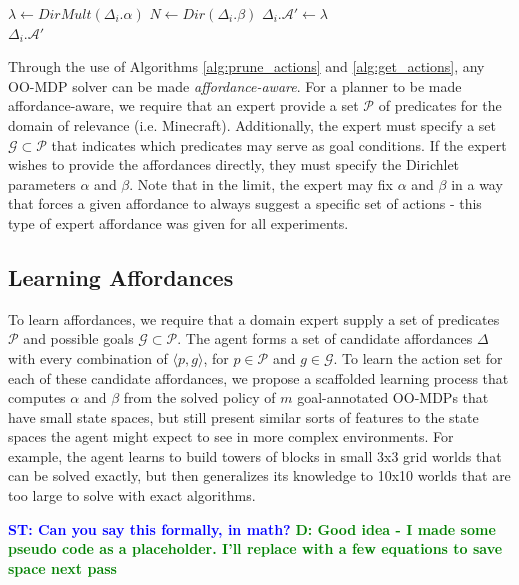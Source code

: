 \documentclass[conference]{IEEEtran}
\newcommand{\stnote}[1]{\textcolor{Blue}{\textbf{ST: #1}}}
\newcommand{\dnote}[1]{\textcolor{Green}{\textbf{D: #1}}}
\begin{document}
\begin{algorithm}
  \caption{$\Delta_i.getActions(s)$}
  \begin{algorithmic}[1]
    \State $\lambda \leftarrow DirMult(\Delta_i.\alpha)$
    \State $N \leftarrow Dir(\Delta_i.\beta)$
    \State $\Delta_i.\mathcal{A}' \leftarrow \lambda$
    \EndFor \\
    \Return $\Delta_i.\mathcal{A}'$
  \end{algorithmic}
  \label{alg:get_actions}
\end{algorithm}

Through the use of Algorithms \ref{alg:prune_actions} and \ref{alg:get_actions}, any OO-MDP solver can be made
{\it affordance-aware}. For a planner to be made affordance-aware, we require that an expert provide a set $\mathcal{P}$ of predicates
for the domain of relevance (i.e. Minecraft). Additionally, the expert must specify a set
$\mathcal{G} \subset \mathcal{P}$ that indicates which predicates may serve as goal conditions. If the expert wishes
to provide the affordances directly, they must specify the Dirichlet parameters $\alpha$ and $\beta$. Note that
in the limit, the expert may fix $\alpha$ and $\beta$ in a way that forces a given
affordance to always suggest a specific set of actions - this type of expert affordance was given for all
experiments.

\subsection{Learning Affordances}

To learn affordances, we require that a domain expert supply a set of predicates
$\mathcal{P}$ and possible goals $\mathcal{G} \subset \mathcal{P}$.
The agent forms a set of candidate affordances $\Delta$ with every
combination of $\langle p, g \rangle$, for $p \in \mathcal{P}$ and $g
\in \mathcal{G}$.  To learn the action set for each of these candidate
affordances, we propose a scaffolded learning process that computes
$\alpha$ and $\beta$ from the solved policy of $m$ goal-annotated
OO-MDPs that have small state spaces, but still present similar sorts
of features to the state spaces the agent might expect to see in more
complex environments.  For example, the agent learns to build towers
of blocks in small 3x3 grid worlds that can be solved exactly, but
then generalizes its knowledge to 10x10 worlds that are too large to
solve with exact algorithms.

\stnote{Can you say this formally, in math?}
\dnote{Good idea - I made some pseudo code as a placeholder. I'll replace with a few equations to save space next pass}
\end{document}
